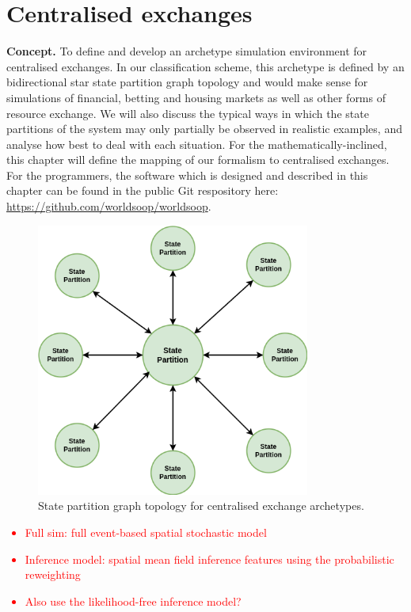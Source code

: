 \chapter{\sffamily Centralised exchanges}

{\bfseries\sffamily Concept.} To define and develop an archetype simulation environment for centralised exchanges. In our classification scheme, this archetype is defined by an bidirectional star state partition graph topology and would make sense for simulations of financial, betting and housing markets as well as other forms of resource exchange. We will also discuss the typical ways in which the state partitions of the system may only partially be observed in realistic examples, and analyse how best to deal with each situation. For the mathematically-inclined, this chapter will define the mapping of our formalism to centralised exchanges. For the programmers, the software which is designed and described in this chapter can be found in the public Git respository here: \href{https://github.com/worldsoop/worldsoop}{https://github.com/worldsoop/worldsoop}.

\begin{figure}[h]
\centering
\includegraphics[width=9cm]{images/chapter-10-state-partition-graph.drawio.png}
\caption{State partition graph topology for centralised exchange archetypes.}
\label{fig:state-partition-graph-centralised-exchanges}
\end{figure}

\textcolor{red}{
\begin{itemize}
\item{Full sim: full event-based spatial stochastic model}
\item{Inference model: spatial mean field inference features using the probabilistic reweighting }
\item{Also use the likelihood-free inference model?}
\end{itemize}
}

